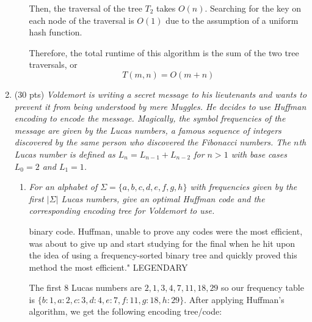 \documentclass[12pt]{article}
\begin{document}
\begin{enumerate}
\begin{enumerate}
	Then, the traversal of the tree $T_2$ takes $O(n)$. Searching for the key on each node of the traversal is $O(1)$ due to the assumption of a uniform hash function.
	
	Therefore, the total runtime of this algorithm is the sum of the two tree traversals, or 
	\[
	\boxed{T(m,n) = O(m+n)}
	\]
	

	\end{enumerate}


    \newpage
	\item (30 pts) \textit{Voldemort is writing a secret message to his lieutenants and wants to prevent it from being understood by mere Muggles. He decides to use Huffman encoding to encode the message. Magically, the symbol 
frequencies of the message are given by the \textit{Lucas numbers}, a famous sequence of integers discovered by the same person who discovered the \textit{Fibonacci numbers}. The $n$th Lucas number is defined as $L_{n} = 
L_{n-1}+L_{n-2}$ for $n>1$ with base cases $L_{0}=2$ and $L_{1}=1$.}

	\begin{enumerate}

	\item \label{q:huff:a} \textit{For an alphabet of $\Sigma=\{a,b,c,d,e,f,g,h\}$ with frequencies given by the first $|\Sigma|$ Lucas numbers, give an optimal Huffman code and the corresponding encoding tree for Voldemort to 
use.}
	
binary code. Huffman, unable to prove any codes were the most efficient, was about to give up and start studying for the final when he hit upon the idea of using a frequency-sorted binary tree and quickly proved this method the 
most efficient." LEGENDARY
	
	The first 8 Lucas numbers are $2, 1, 3, 4, 7, 11, 18, 29$ so our frequency table is $\{b: 1, a: 2, c: 3, d: 4, e: 7, f: 11, g: 18, h: 29\}$. After applying Huffman's algorithm, we get the following encoding tree/code: 
	
	\begin{center}
\end{center}
\end{enumerate}
\end{enumerate}
\end{document}
